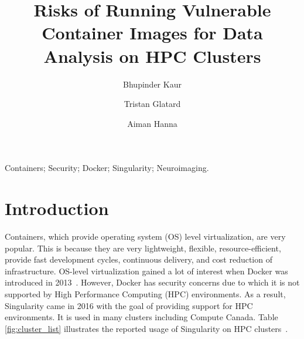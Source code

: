 \documentclass[a4paper,num-refs]{oup-contemporary}
\title{Risks of Running Vulnerable Container Images for Data Analysis on HPC
Clusters}
\begin{document}
\author[1]{Bhupinder Kaur}
\author[1]{Tristan Glatard}
\author[1]{Aiman Hanna}


\maketitle

\begin{keywords}
Containers; Security; Docker; Singularity; Neuroimaging.
\end{keywords}


\section{Introduction}

Containers, which provide operating system (OS) level virtualization, are very
popular. This is because they are very lightweight, flexible, resource-efficient,
provide fast development cycles, continuous delivery,
and cost reduction of infrastructure. OS-level virtualization gained a lot of interest when Docker was
introduced in 2013~\cite{gantikow2016providing}. However, Docker has security concerns due to which it
is not supported by High Performance
Computing (HPC) environments. As a result, Singularity came in 2016 with the goal of providing support
for HPC environments. It is used in many clusters including Compute Canada.
Table \ref{fig:cluster_list} illustrates the reported usage of Singularity on HPC clusters~\cite{kurtzer2017singularity}.

\end{document}
